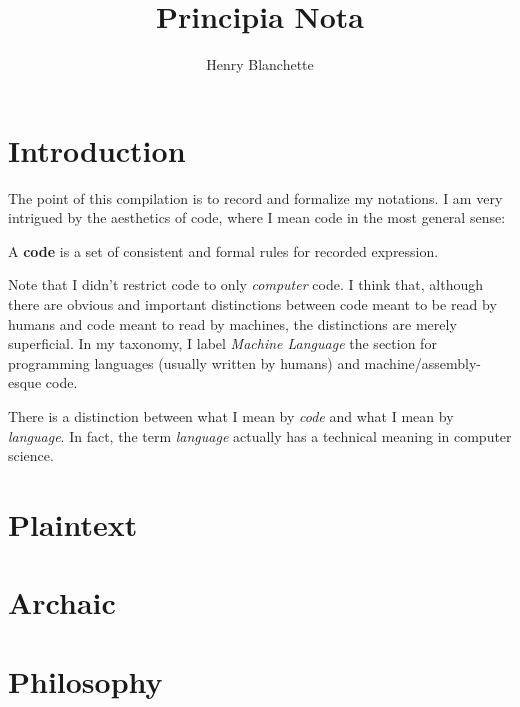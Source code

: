 \documentclass{article}
\title{Principia Nota}
\author{Henry Blanchette}
\date{}
\newcommand{\definition}[1]{
	\vspace{5px}
	\noindent {\sc Definition.} #1
	\vspace{5px}
}
\begin{document}
\maketitle
\tableofcontents

\newpage

\section{Introduction}

The point of this compilation is to record and formalize my notations. I am very intrigued by the aesthetics of code, where I mean code in the most general sense:

\definition{A \textbf{code} is a set of consistent and formal rules for recorded expression.}

Note that I didn't restrict code to only \textit{computer} code. I think that, although there are obvious and important distinctions between code meant to be read by humans and code meant to read by machines, the distinctions are merely superficial. In my taxonomy, I label \textit{Machine Language} the section for programming languages (usually written by humans) and machine/assembly-esque code.

There is a distinction between what I mean by \textit{code} and what I mean by \textit{language}. In fact, the term \textit{language} actually has a technical meaning in computer science.

\newpage

	
\section{Plaintext}

\section{Archaic}

\section{Philosophy}
\end{document}
